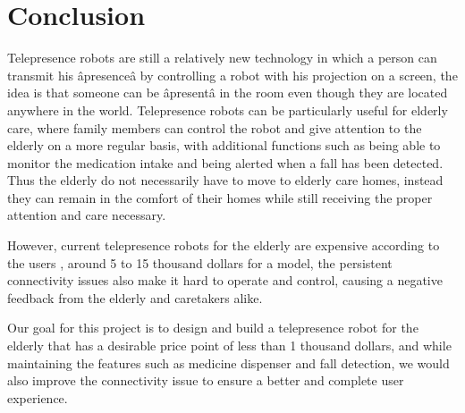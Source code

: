 \documentclass[12pt]{article}
\begin{document}
\section{Conclusion}
Telepresence robots are still a relatively new technology in which a person can transmit his âpresenceâ by controlling a robot with his projection on a screen, the idea is that someone can be âpresentâ in the room even though they are located anywhere in the world. Telepresence robots can be particularly useful for elderly care, where family members can control the robot and give attention to the elderly on a more regular basis, with additional functions such as being able to monitor the medication intake and being alerted when a fall has been detected. Thus the elderly do not necessarily have to move to elderly care homes, instead they can remain in the comfort of their homes while still receiving the proper attention and care necessary.\par
However, current telepresence robots for the elderly are expensive according to the users\cite{6} , around 5 to 15 thousand dollars for a model, the persistent connectivity issues also make it hard to operate and control, causing a negative feedback from the elderly and caretakers alike\cite{7}.\par
Our goal for this project is to design and build a telepresence robot for the elderly that has a desirable price point of less than 1 thousand dollars, and while maintaining the features such as medicine dispenser and fall detection, we would also improve the connectivity issue to ensure a better and complete user experience.
\newpage
\end{document}
